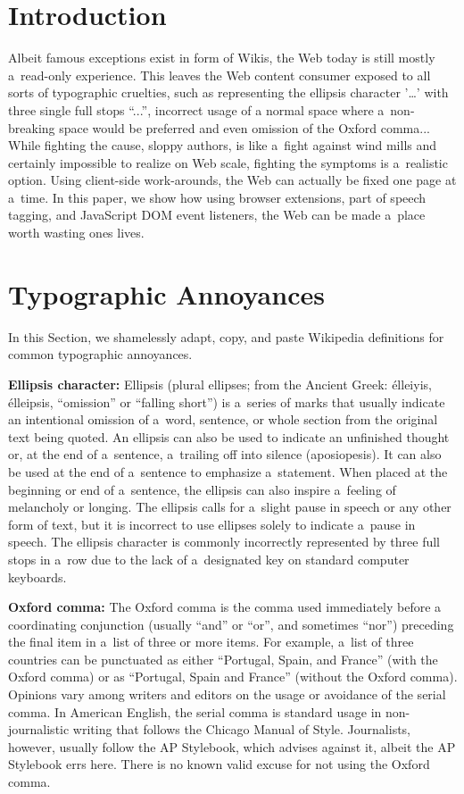 \documentclass{acm_proc_article-sp}
\begin{document}

\section{Introduction}
Albeit famous exceptions exist in form of Wikis,
the Web today is still mostly a~read-only experience.
This leaves the Web content consumer exposed to all sorts of typographic cruelties,
such as representing the ellipsis character '\ldots' with three single full stops ``...'',
incorrect usage of a \linebreak %
normal space where a~non-breaking space would be preferred
and even omission of the Oxford comma...
While fighting the cause, sloppy authors, is like a~fight against wind mills
and certainly impossible to realize on Web scale,
fighting the symptoms is a~realistic option.
Using client-side work-arounds, the Web can actually be fixed one page at a~time.
In this paper, we show how using browser extensions, part of speech tagging,
and JavaScript DOM event listeners,
the Web can be made a~place worth wasting ones lives.

\section{Typographic Annoyances}
In this Section, we shamelessly adapt, copy,
and paste Wikipedia definitions for common typographic annoyances.

\textbf{Ellipsis character:} Ellipsis (plural ellipses; from the Ancient Greek:
\greektext élleiyis, %
\latintext élleipsis, ``omission'' or ``falling short'')
is a~series of marks that usually indicate an intentional omission of a~word,
sentence, or whole section from the original text being quoted.
An ellipsis can also be used to indicate an unfinished thought or,
at the end of a~sentence, a~trailing off into silence (aposiopesis).
It can also be used at the end of a~sentence to emphasize a~statement.
When placed at the beginning or end of a~sentence,
the ellipsis can also inspire a~feeling of melancholy or longing.
The ellipsis calls for a~slight pause in speech or any other form of text,
but it is incorrect to use ellipses solely to indicate a~pause in speech.
The ellipsis character is commonly incorrectly represented
by three full stops in a~row due to the lack of a~designated key on standard computer keyboards.

\textbf{Oxford comma:} The Oxford comma is the comma used immediately before a coordinating conjunction (usually ``and'' or ``or'',
and sometimes ``nor'') preceding the final item in a~list of three or more items.
For example, a~list of three countries can be punctuated as either
``Portugal, Spain, and France'' (with the Oxford comma) or as
``Portugal, Spain and France'' (without the Oxford comma).
Opinions vary among writers and editors on the usage or avoidance of the serial comma.
In American English, the serial comma is standard usage in non-journalistic writing that follows the Chicago Manual of Style.
Journalists, however, usually follow the AP Stylebook, which advises against it,
albeit the AP Stylebook errs here.
There is no known valid excuse for not using the Oxford comma.
\end{document}
